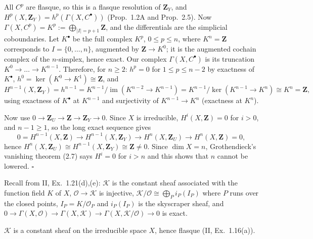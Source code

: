 \documentclass[11pt]{article}
\begin{document}
All $C^p$ are flasque, so this is a flasque resolution of $\mathbf Z_Y$, and $H^p(X,\mathbf Z_Y)=h^p(\Gamma(X,C^\bullet))$ (Prop.~1.2A and Prop.~2.5). Now $\Gamma(X,C^p)=K^p:=\bigoplus_{|I|=p+1}\mathbf Z$, and the differentials are the simplicial coboundaries. Let $K^\bullet$ be the full complex $K^p$, $0\le p\le n$, where $K^n=\mathbf Z$ corresponds to $I=\{0,\dots,n\}$, augmented by $\mathbf Z\to K^0$; it is the augmented cochain complex of the $n$-simplex, hence exact. Our complex $\Gamma(X,C^\bullet)$ is its truncation $K^0\to\dots\to K^{n-1}$. Therefore, for $n\ge2$: $h^p=0$ for $1\le p\le n-2$ by exactness of $K^\bullet$, $h^0=\ker(K^0\to K^1)\cong\mathbf Z$, and
\[
H^{n-1}(X,\mathbf Z_Y)=h^{n-1}=K^{n-1}/\operatorname{im}(K^{n-2}\to K^{n-1})=K^{n-1}/\ker(K^{n-1}\to K^n)\cong K^n=\mathbf Z,
\]
using exactness of $K^\bullet$ at $K^{n-1}$ and surjectivity of $K^{n-1}\to K^n$ (exactness at $K^n$).

Now use $0\to\mathbf Z_U\to\mathbf Z\to\mathbf Z_Y\to0$. Since $X$ is irreducible, $H^i(X,\mathbf Z)=0$ for $i>0$, and $n-1\ge1$, so the long exact sequence gives
\[
0=H^{n-1}(X,\mathbf Z)\to H^{n-1}(X,\mathbf Z_Y)\to H^n(X,\mathbf Z_U)\to H^n(X,\mathbf Z)=0,
\]
hence $H^n(X,\mathbf Z_U)\cong H^{n-1}(X,\mathbf Z_Y)\cong\mathbf Z\neq0$. Since $\dim X=n$, Grothendieck's vanishing theorem (2.7) says $H^i=0$ for $i>n$ and this shows that $n$ cannot be lowered. \hfill$\square$

\pf
Recall from II, Ex.~1.21(d),(e): $\mathcal K$ is the constant sheaf associated with the function field $K$ of $X$, $\mathcal O\to\mathcal K$ is injective, $\mathcal K/\mathcal O\cong\bigoplus_{P}i_P(I_P)$ where $P$ runs over the closed points, $I_P=K/\mathcal O_P$ and $i_P(I_P)$ is the skyscraper sheaf, and $0\to\Gamma(X,\mathcal O)\to\Gamma(X,\mathcal K)\to\Gamma(X,\mathcal K/\mathcal O)\to0$ is exact.

$\mathcal K$ is a constant sheaf on the irreducible space $X$, hence flasque (II, Ex.~1.16(a)).
\end{document}
